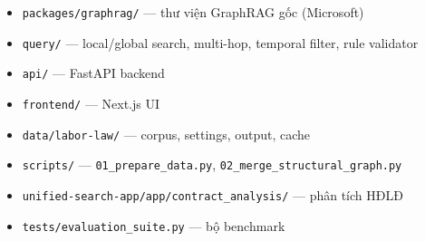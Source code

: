 \documentclass[../DoAn.tex]{subfiles}
\begin{document}
\begin{itemize}[nosep, leftmargin=*]
    \item \texttt{packages/graphrag/} --- thư viện GraphRAG gốc (Microsoft)
    \item \texttt{query/} --- local/global search, multi-hop, temporal filter, rule validator
    \item \texttt{api/} --- FastAPI backend
    \item \texttt{frontend/} --- Next.js UI
    \item \texttt{data/labor-law/} --- corpus, settings, output, cache
    \item \texttt{scripts/} --- \texttt{01\_prepare\_data.py}, \texttt{02\_merge\_structural\_graph.py}
    \item \texttt{unified-search-app/app/contract\_analysis/} --- phân tích HĐLĐ
    \item \texttt{tests/evaluation\_suite.py} --- bộ benchmark
\end{itemize}
\end{document}
